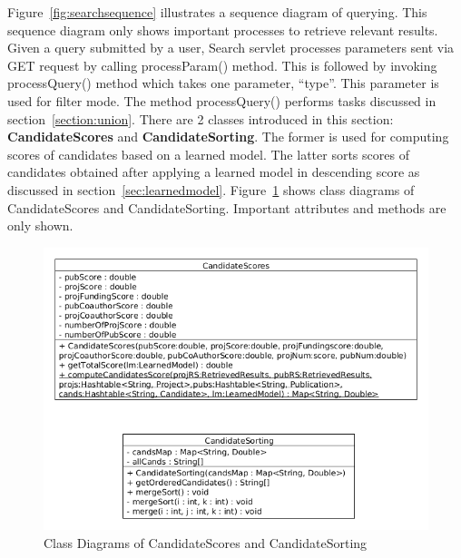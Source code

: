 Figure~\ref{fig:searchsequence} illustrates a sequence diagram of querying. This sequence diagram only shows important processes to retrieve
relevant results. Given a query submitted by a user, Search servlet processes parameters sent via GET request by calling processParam() method. This is
followed by invoking processQuery() method which takes one parameter, ``type''. This parameter is used for filter mode. The method processQuery() 
performs tasks discussed in section~\ref{section:union}. There are 2 classes introduced in this section: \textbf{CandidateScores} and 
\textbf{CandidateSorting}. The former is used for computing scores of candidates based on a learned model. The latter
sorts scores of candidates obtained after applying a learned model in descending score as discussed in section~\ref{sec:learnedmodel}.
Figure~\ref{fig:scoreandsorting} shows class diagrams of CandidateScores and CandidateSorting. Important attributes and methods are only shown.

\begin{figure}
\centering
\includegraphics[scale=0.5]{./figures/score&sorting.png}
\caption{Class Diagrams of CandidateScores and CandidateSorting} \label{fig:scoreandsorting} 
\end{figure}




